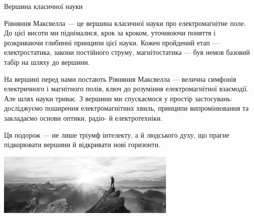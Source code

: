 \documentclass{beamer}
\begin{document}
\begin{frame}{Вершина класичної науки}{}\small
	\begin{block}{}\justifying
        \alert{Рівняння Максвелла --- це вершина класичної науки про електромагнітне поле.} До цієї висоти ми піднімалися, крок за кроком, уточнюючи
        поняття і розкриваючи глибинні принципи цієї науки. Кожен пройдений етап — електростатика, закони постійного струму, магнітостатика — був немов
        базовий табір на шляху до вершини.

        \medskip

        На вершині перед нами постають Рівняння Максвелла --- велична симфонія електричного і магнітного полів, ключ до розуміння електромагнітної
        взаємодії. Але шлях науки триває. З вершини ми спускаємося у простір застосувань: досліджуємо поширення електромагнітних хвиль, принципи
        випромінювання та закладаємо основи оптики, радіо- й електротехніки.

        \medskip

        Ця подорож --- не лише тріумф інтелекту, а й людського духу, що прагне підкорювати вершини й відкривати нові горизонти.
	\end{block}
	\begin{center}
        \includegraphics[height=3cm]{ontop}
	\end{center}
\end{frame}
\end{document}
